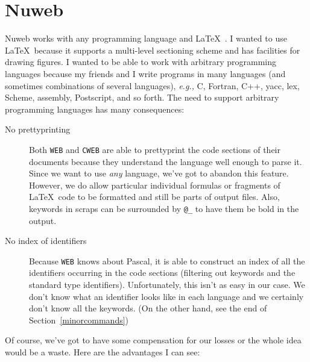 \documentclass[a4paper]{report}
\begin{document}
\section{Nuweb}

Nuweb works with any programming language and \LaTeX~\cite{Lamport:LDP85}. I
wanted to use \LaTeX\ because it supports a multi-level sectioning
scheme and has facilities for drawing figures. I wanted to be able to
work with arbitrary programming languages because my friends and I
write programs in many languages (and sometimes combinations of
several languages), {\em e.g.,} C, Fortran, C++, yacc, lex, Scheme,
assembly, Postscript, and so forth. The need to support arbitrary
programming languages has many consequences:
\begin{description}
\item[No prettyprinting] Both \verb|WEB| and \verb|CWEB| are able to
  prettyprint the code sections of their documents because they
  understand the language well enough to parse it. Since we want to use
  {\em any\/} language, we've got to abandon this feature.
  However, we do allow particular individual formulas or fragments
  of \LaTeX\ code to be formatted and still be parts of output files.
  Also, keywords in scraps can be surrounded by \verb|@_| to
  have them be bold in the output.
\item[No index of identifiers] Because \verb|WEB| knows about Pascal,
  it is able to construct an index of all the identifiers occurring in
  the code sections (filtering out keywords and the standard type
  identifiers). Unfortunately, this isn't as easy in our case. We don't
  know what an identifier looks like in each language and we certainly
  don't know all the keywords. (On the other hand, see the end of
  Section~\ref{minorcommands})
\end{description}
Of course, we've got to have some compensation for our losses or the
whole idea would be a waste. Here are the advantages I can see:
\end{document}
